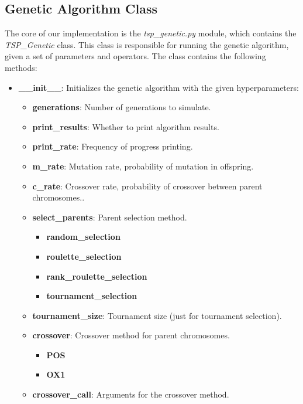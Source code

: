 \documentclass[11pt]{article}
\begin{document}
\begin{itemize}
\subsection{Genetic Algorithm Class}
The core of our implementation is the \textit{tsp\_genetic.py} module, which contains the \textit{TSP\_Genetic} class. This class is responsible for running the genetic algorithm, given a set of parameters and operators. The class contains the following methods:
\begin{itemize}
    \item \textbf{\_\_init\_\_}: Initializes the genetic algorithm with the given hyperparameters:
        \begin{itemize}
            \item \textbf{generations}: Number of generations to simulate.
            \item \textbf{print\_results}: Whether to print algorithm results.
            \item \textbf{print\_rate}: Frequency of progress printing.
            \item \textbf{m\_rate}: Mutation rate, probability of mutation in offspring.
            \item \textbf{c\_rate}: Crossover rate, probability of crossover between parent chromosomes..
            \item \textbf{select\_parents}: Parent selection method.
                \begin{itemize}
                    \item \textbf{random\_selection}
                    \item \textbf{roulette\_selection}
                    \item \textbf{rank\_roulette\_selection}
                    \item \textbf{tournament\_selection}
                \end{itemize}
            \item \textbf{tournament\_size}: Tournament size (just for tournament selection).
            \item \textbf{crossover}: Crossover method for parent chromosomes.
                \begin{itemize}
                    \item \textbf{POS}
                    \item \textbf{OX1}
                \end{itemize}
            \item \textbf{crossover\_call}: Arguments for the crossover method.

\end{itemize}
\end{itemize}
\end{itemize}
\end{document}
